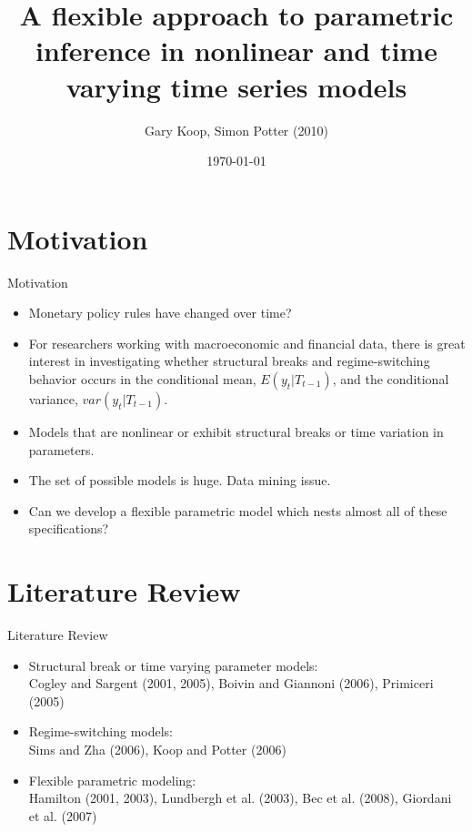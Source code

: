 \documentclass[dvipsnames,mathserif]{beamer}
\begin{document}
\rightskip\rightmargin
\title{A flexible approach to parametric inference in nonlinear and time varying time series models }
\author{Gary Koop, Simon Potter (2010)}


\footnotesize{\date{\today }


\begin{frame}
\maketitle
\end{frame}


%
\footnotesize \tableofcontents
%
\section{Motivation}
\begin{frame}{Motivation}
    \begin{itemize}
        \item Monetary policy rules have changed over time?
        \item For researchers working with macroeconomic and financial data, there is great interest in investigating whether structural breaks and regime-switching behavior occurs in the conditional mean, $E(y_t|T_{t-1})$, and the conditional variance, $var(y_t|T_{t-1})$.
        \item Models that are nonlinear or exhibit structural breaks or time variation in parameters.
        \item The set of possible models is huge. Data mining issue.
        \item Can we develop a flexible parametric model which nests almost all of these specifications?
    \end{itemize}  
\end{frame}


\section{Literature Review}
\begin{frame}{Literature Review}
    \begin{itemize}
        \item Structural break or time varying parameter models:\\
        Cogley and Sargent (2001, 2005), Boivin and Giannoni (2006), Primiceri (2005)
        \item Regime-switching models:\\
        Sims and Zha (2006), Koop and Potter (2006)
        \item Flexible parametric modeling:\\
        Hamilton (2001, 2003), Lundbergh et al. (2003), Bec et al. (2008), Giordani et al. (2007)
    \end{itemize}
\end{frame}

}
\end{document}
